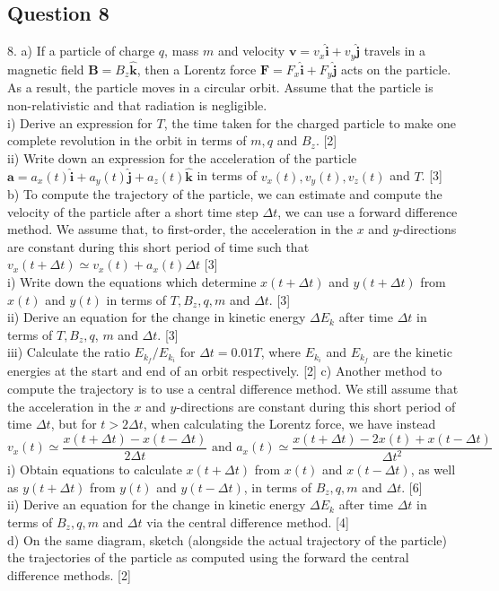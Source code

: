 \documentclass{article}
\begin{document}
\subsection{Question 8}
8. a) If a particle of charge $q$, mass $m$ and velocity $\mathbf{v}=v_{x} \hat{\mathbf{i}}+v_{y} \hat{\mathbf{j}}$ travels in a magnetic field $\mathbf{B}=B_{z} \hat{\mathbf{k}}$, then a Lorentz force $\mathbf{F}=F_{x} \hat{\mathbf{i}}+F_{y} \hat{\mathbf{j}}$ acts on the particle. As a result, the particle moves in a circular orbit. Assume that the particle is non-relativistic and that radiation is negligible. \\
i) Derive an expression for $T$, the time taken for the charged particle to make one complete revolution in the orbit in terms of $m, q$ and $B_{z}$. [2] \\
ii) Write down an expression for the acceleration of the particle $\mathbf{a}=a_{x}(t) \hat{\mathbf{i}}+a_{y}(t) \hat{\mathbf{j}}+a_{z}(t) \hat{\mathbf{k}}$ in terms of $v_{x}(t), v_{y}(t), v_{z}(t)$ and $T$. [3] \\
b) To compute the trajectory of the particle, we can estimate and compute the velocity of the particle after a short time step $\Delta t$, we can use a forward difference method. We assume that, to first-order, the acceleration in the $x$ and $y$-directions are constant during this short period of time such that $v_{x}(t+\Delta t) \simeq v_{x}(t)+a_{x}(t) \Delta t$ [3] \\
i) Write down the equations which determine $x(t+\Delta t)$ and $y(t+\Delta t)$ from $x(t)$ and $y(t)$ in terms of $T, B_{z}, q, m$ and $\Delta t$. [3] \\
ii) Derive an equation for the change in kinetic energy $\Delta E_{k}$ after time $\Delta t$ in terms of $T, B_{z}, q$, $m$ and $\Delta t$. [3] \\
iii) Calculate the ratio $E_{k_{f}} / E_{k_{i}}$ for $\Delta t=0.01 T$, where $E_{k_{i}}$ and $E_{k_{f}}$ are the kinetic energies at the start and end of an orbit respectively. [2]
c) Another method to compute the trajectory is to use a central difference method. We still assume that the acceleration in the $x$ and $y$-directions are constant during this short period of time $\Delta t$, but for $t>2 \Delta t$, when calculating the Lorentz force, we have instead
$$
v_{x}(t) \simeq \frac{x(t+\Delta t)-x(t-\Delta t)}{2 \Delta t} \text { and } a_{x}(t) \simeq \frac{x(t+\Delta t)-2 x(t)+x(t-\Delta t)}{\Delta t^{2}}
$$
i) Obtain equations to calculate $x(t+\Delta t)$ from $x(t)$ and $x(t-\Delta t)$, as well as $y(t+\Delta t)$ from $y(t)$ and $y(t-\Delta t)$, in terms of $B_{z}, q, m$ and $\Delta t$. [6] \\
ii) Derive an equation for the change in kinetic energy $\Delta E_{k}$ after time $\Delta t$ in terms of $B_{z}, q, m$ and $\Delta t$ via the central difference method. [4] \\
d) On the same diagram, sketch (alongside the actual trajectory of the particle) the trajectories of the particle as computed using the forward the central difference methods. [2]
\end{document}
